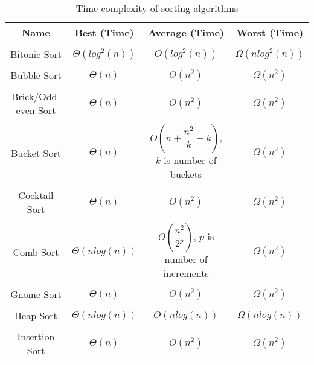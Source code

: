 \bigskip
\begin{table}[h!]
\centering
\begin{tabular}{||c c c c||} 
\hline
Name & Best (Time) & Average (Time) & Worst (Time) \\ [1ex] 
\hline\hline
 & & & \\
Bitonic Sort & \(\Theta(log^2(n))\) & \(O(log^2(n))\) & \(\Omega(nlog^2(n))\) \\ 
 & & & \\
Bubble Sort & \(\Theta(n)\) & \(O(n^2)\) & \(\Omega(n^2)\) \\ 
 & & & \\
Brick/Odd-even Sort & \(\Theta(n)\) & \(O(n^2)\) & \(\Omega(n^2)\) \\ 
 & & & \\
Bucket Sort & \(\Theta(n)\) & \(O(n+\dfrac{n^2}{k}+k)\), \(k\) is number of buckets & \(\Omega(n^2)\) \\ 
 & & & \\
Cocktail Sort & \(\Theta(n)\) & \(O(n^2)\) & \(\Omega(n^2)\) \\ 
 & & & \\
Comb Sort & \(\Theta(nlog(n))\) & \(O(\dfrac{n^2}{2^p})\), \(p\) is number of increments & \(\Omega(n^2)\) \\ 
 & & & \\
Gnome Sort & \(\Theta(n)\) & \(O(n^2)\) & \(\Omega(n^2)\) \\ 
 & & & \\
Heap Sort & \(\Theta(nlog(n))\) & \(O(nlog(n))\) & \(\Omega(nlog(n))\) \\ 
 & & & \\
Insertion Sort & \(\Theta(n)\) & \(O(n^2)\) & \(\Omega(n^2)\) \\ [1ex]
\hline
\end{tabular}
\caption{Time complexity of sorting algorithms}
\label{table:time_complexity_1}
\end{table}

